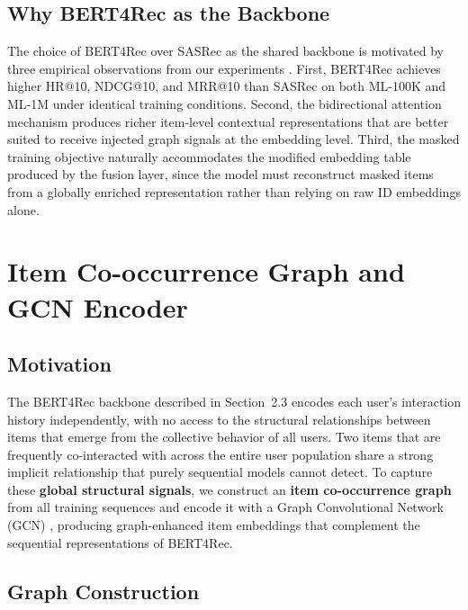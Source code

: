 \documentclass[12pt,a4paper]{report}
\newcommand{\parencite}[1]{\citep{#1}}
\begin{document}
\subsection{Why BERT4Rec as the Backbone}

The choice of BERT4Rec over SASRec as the shared backbone is
motivated by three empirical observations from our experiments
\parencite{ouledmeriem2025hybrid}. First, BERT4Rec achieves
higher HR@10, NDCG@10, and MRR@10 than SASRec on both ML-100K
and ML-1M under identical training conditions. Second, the
bidirectional attention mechanism produces richer item-level
contextual representations that are better suited to receive
injected graph signals at the embedding level. Third, the
masked training objective naturally accommodates the modified
embedding table produced by the fusion layer, since the model
must reconstruct masked items from a globally enriched
representation rather than relying on raw ID embeddings alone.

\section{Item Co-occurrence Graph and GCN Encoder}

\subsection{Motivation}

The BERT4Rec backbone described in Section~2.3 encodes each user's
interaction history independently, with no access to the structural
relationships between items that emerge from the collective behavior
of all users. Two items that are frequently co-interacted with
across the entire user population share a strong implicit
relationship that purely sequential models cannot detect. To capture
these \textbf{global structural signals}, we construct an
\textbf{item co-occurrence graph} from all training sequences and
encode it with a Graph Convolutional Network (GCN)
\parencite{kipf2017gcn}, producing graph-enhanced item embeddings
that complement the sequential representations of BERT4Rec.

\subsection{Graph Construction}
\end{document}
